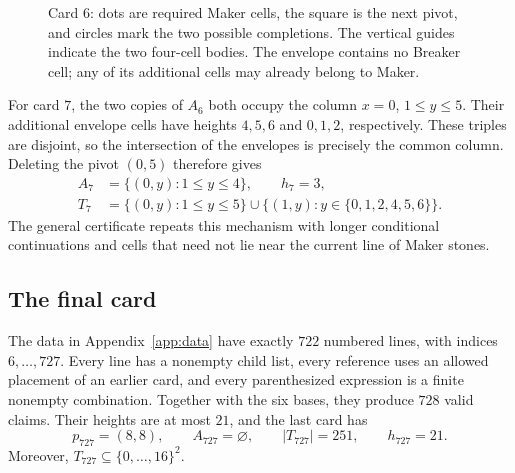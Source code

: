 \begin{figure}[tb]
\centering
{}
\caption{Card $6$: dots are required Maker cells, the square is the
next pivot, and circles mark the two possible completions. The
vertical guides indicate the two four-cell bodies. The envelope
contains no Breaker cell; any of its additional cells may already
belong to Maker.}
\label{fig:fork}
\end{figure}

For card $7$, the two copies of $A_6$ both occupy the column
$x=0$, $1\le y\le5$. Their additional envelope cells have heights
$4,5,6$ and $0,1,2$, respectively. These triples are disjoint, so
the intersection of the envelopes is precisely the common column.
Deleting the pivot $(0,5)$ therefore gives
\[
 \begin{split}
 A_7&=\{(0,y):1\le y\le4\},\qquad h_7=3,\\
 T_7&=\{(0,y):1\le y\le5\}
       \cup\{(1,y):y\in\{0,1,2,4,5,6\}\}.
 \end{split}
\]
The general certificate repeats this mechanism with longer
conditional continuations and cells that need not lie near the
current line of Maker stones.

\subsection{The final card}

\begin{proposition}\label{prop:certificate}
The data in Appendix~\ref{app:data} have exactly $722$ numbered
lines, with indices $6,\ldots,727$. Every line has a nonempty child
list, every reference uses an allowed placement of an earlier card,
and every parenthesized expression is a finite nonempty combination.
Together with the six bases, they produce $728$ valid claims.
Their heights are at most $21$, and the last card has
\begin{equation}\label{eq:final-card}
 p_{727}=(8,8),\qquad A_{727}=\varnothing,
 \qquad |T_{727}|=251,\qquad h_{727}=21.
\end{equation}
Moreover, $T_{727}\subseteq\{0,\ldots,16\}^2$.
\end{proposition}

